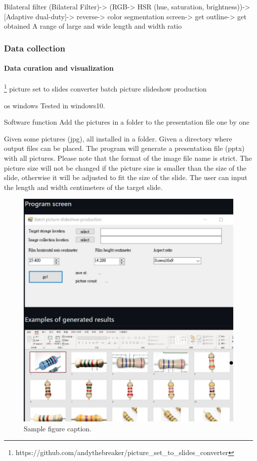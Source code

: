 \documentclass{article}
\begin{document}
Bilateral filter (Bilateral Filter)-> (RGB-> HSR (hue, saturation, brightness))-> [Adaptive dual-duty]-> reverse-> color segmentation screen-> get outline-> get obtained A range of large and wide length and width ratio
\subsubsection{Data collection}

\paragraph{Data curation and visualization}
\footnote{https://github.com/andythebreaker/picture\_set\_to\_slides\_converter}
picture set to slides converter
batch picture slideshow production

os
windows Tested in windows10.

Software function
Add the pictures in a folder to the presentation file one by one

Given some pictures (jpg), all installed in a folder.
Given a directory where output files can be placed.
The program will generate a presentation file (pptx) with all pictures.
Please note that the format of the image file name is strict.
The picture size will not be changed if the picture size is smaller than the size of the slide, otherwise it will be adjusted to fit the size of the slide.
The user can input the length and width centimeters of the target slide.

\begin{figure}
	\centering
	\includegraphics[width=0.7\linewidth]{SIj7pfq.png}
	\caption{Sample figure caption.}
	\label{fig:SIj7pfq}
\end{figure}
\end{document}
